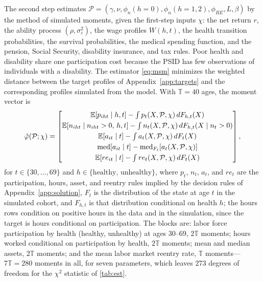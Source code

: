 The second step estimates $\mathcal{P}=(\gamma,\nu,\allowbreak\phi_n(h{=}0),\allowbreak\phi_n(h{=}1,2),\allowbreak\phi_{RE},L,\beta)$ by the method of simulated moments, given the first-step inputs $\chi$: the net return $r$, the ability process $(\rho,\sigma_\varepsilon^2)$, the wage profiles $W(h,t)$, the health transition probabilities, the survival probabilities, the medical spending function, and the pension, Social Security, disability insurance, and tax rules. %
Poor health and disability share one participation cost because the PSID has few observations of individuals with a disability. %
The estimator \eqref{eq:msm} minimizes the weighted distance between the target profiles of Appendix~\ref{app:targets} and the corresponding profiles simulated from the model. %
With $\mathbb{T}=40$ ages, the moment vector is %
\begin{equation}\label{eq:moments}
\hat{\varphi}(\mathcal{P};\chi)=
\begin{bmatrix}
{\mathbb E}[p_{iht}\mid h,t]-\int p_t(X,\mathcal{P},\chi)\,dF_{h,t}(X)\\[0.3em]
{\mathbb E}[n_{iht}\mid n_{iht}>0,\,h,t]-\int n_t(X,\mathcal{P},\chi)\,dF_{h,t}(X\mid n_t>0)\\[0.3em]
{\mathbb E}[a_{it}\mid t]-\int a_t(X,\mathcal{P},\chi)\,dF_{t}(X)\\[0.3em]
\operatorname{med}[a_{it}\mid t]-\operatorname{med}_{F_t}[a_t(X,\mathcal{P},\chi)]\\[0.3em]
{\mathbb E}[re_{it}\mid t]-\int re_t(X,\mathcal{P},\chi)\,dF_{t}(X)
\end{bmatrix},
\end{equation}
for $t\in\{30,\dots,69\}$ and $h\in\{\text{healthy},\,\text{unhealthy}\}$, where $p_t$, $n_t$, $a_t$, and $re_t$ are the participation, hours, asset, and reentry rules implied by the decision rules of Appendix~\ref{app:solution}, $F_t$ is the distribution of the state at age $t$ in the simulated cohort, and $F_{h,t}$ is that distribution conditional on health $h$; the hours rows condition on positive hours in the data and in the simulation, since the target is hours conditional on participation. %
The blocks are: labor force participation by health (healthy, unhealthy) at ages 30--69, $2\mathbb{T}$ moments; hours worked conditional on participation by health, $2\mathbb{T}$ moments; mean and median assets, $2\mathbb{T}$ moments; and the mean labor market reentry rate, $\mathbb{T}$ moments---$7\mathbb{T}=280$ moments in all, for seven parameters, which leaves 273 degrees of freedom for the $\chi^2$ statistic of \autoref{tab:est}. %
